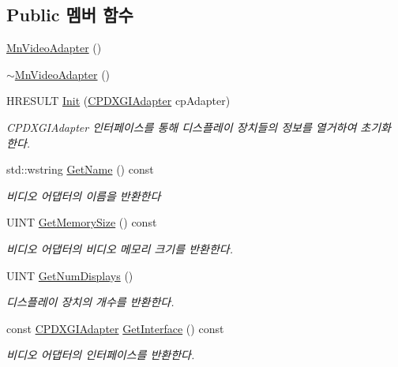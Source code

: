 \subsection*{Public 멤버 함수}
\begin{DoxyCompactItemize}
\item 
\hyperlink{class_m_n_l_1_1_mn_video_adapter_ac70ef4ef6b81876705d05ce05818b6da}{Mn\+Video\+Adapter} ()
\item 
\hyperlink{class_m_n_l_1_1_mn_video_adapter_a4248956c1f9981df00d983f55956930a}{$\sim$\+Mn\+Video\+Adapter} ()
\item 
H\+R\+E\+S\+U\+LT \hyperlink{class_m_n_l_1_1_mn_video_adapter_a32cf49f2fc53369e5ac7db8861a5dd53}{Init} (\hyperlink{namespace_m_n_l_ab0e24805043a50c45364c389f8929f33}{C\+P\+D\+X\+G\+I\+Adapter} cp\+Adapter)
\begin{DoxyCompactList}\small\item\em C\+P\+D\+X\+G\+I\+Adapter 인터페이스를 통해 디스플레이 장치들의 정보를 열거하여 초기화 한다. \end{DoxyCompactList}\item 
std\+::wstring \hyperlink{class_m_n_l_1_1_mn_video_adapter_a7c6440afa08007a034c42fd69af97bc0}{Get\+Name} () const
\begin{DoxyCompactList}\small\item\em 비디오 어댑터의 이름을 반환한다 \end{DoxyCompactList}\item 
U\+I\+NT \hyperlink{class_m_n_l_1_1_mn_video_adapter_ab808ef75e5741aafa34e295df44fa734}{Get\+Memory\+Size} () const
\begin{DoxyCompactList}\small\item\em 비디오 어댑터의 비디오 메모리 크기를 반환한다. \end{DoxyCompactList}\item 
U\+I\+NT \hyperlink{class_m_n_l_1_1_mn_video_adapter_a89622e2450c14827f83cdd0a783da999}{Get\+Num\+Displays} ()
\begin{DoxyCompactList}\small\item\em 디스플레이 장치의 개수를 반환한다. \end{DoxyCompactList}\item 
const \hyperlink{namespace_m_n_l_ab0e24805043a50c45364c389f8929f33}{C\+P\+D\+X\+G\+I\+Adapter} \hyperlink{class_m_n_l_1_1_mn_video_adapter_a00045e64751e6804e2901ed6bdf49e40}{Get\+Interface} () const
\begin{DoxyCompactList}\small\item\em 비디오 어댑터의 인터페이스를 반환한다. \end{DoxyCompactList}\item 

\end{DoxyCompactItemize}
